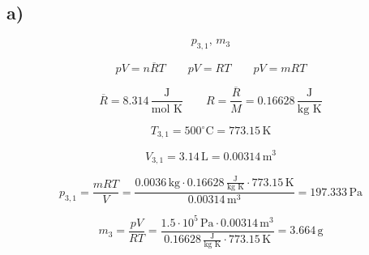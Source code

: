 

\subsection*{a)}

\[
p_{3,1}, \, m_3
\]

\[
pV = n\overline{R}T \quad \quad pV = RT \quad \quad pV = mRT
\]

\[
\overline{R} = 8.314 \, \frac{\text{J}}{\text{mol K}} \quad \quad R = \frac{\overline{R}}{M} = 0.16628 \, \frac{\text{J}}{\text{kg K}}
\]

\[
T_{3,1} = 500^\circ \text{C} = 773.15 \, \text{K}
\]

\[
V_{3,1} = 3.14 \, \text{L} = 0.00314 \, \text{m}^3
\]

\[
p_{3,1} = \frac{mRT}{V} = \frac{0.0036 \, \text{kg} \cdot 0.16628 \, \frac{\text{J}}{\text{kg K}} \cdot 773.15 \, \text{K}}{0.00314 \, \text{m}^3} = 197.333 \, \text{Pa}
\]

\[
m_3 = \frac{pV}{RT} = \frac{1.5 \cdot 10^5 \, \text{Pa} \cdot 0.00314 \, \text{m}^3}{0.16628 \, \frac{\text{J}}{\text{kg K}} \cdot 773.15 \, \text{K}} = 3.664 \, \text{g}
\]